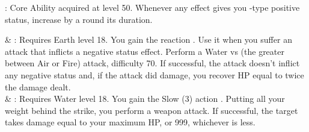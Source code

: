 \begin{ffminipage}
\noindent{}: Core Ability acquired at level 50. Whenever any effect gives you -type positive status, increase by a round its duration. \pc

\begin{jobspec}
 & %
: Requires Earth level 18. You gain the reaction . Use it when you suffer an attack that inflicts a negative status effect. Perform a Water vs (the greater between Air or Fire) attack, difficulty 70. If successful, the attack doesn’t inflict any negative status and, if the attack did damage, you recover HP equal to twice the damage dealt. \\
 & %
: Requires Water level 18. You gain the Slow (3)  action . Putting all your weight behind the strike, you perform a weapon attack. If successful, the target takes damage equal to your maximum HP, or 999, whichever is less. \\
\end{jobspec}
\end{ffminipage}